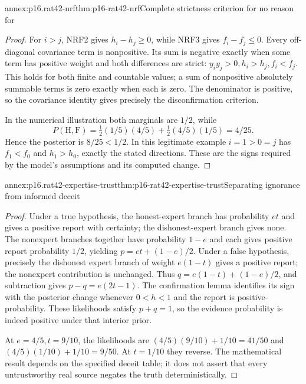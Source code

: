 \begin{annexitem}{annex:p16.rat42-nrf}{thm:p16-rat42-nrf}{Complete strictness criterion for no reason for}
\begin{proof}
For \(i>j\), NRF2 gives \(h_i-h_j\geq0\), while NRF3
gives \(f_i-f_j\leq0\). Every off-diagonal covariance term
is nonpositive. Its sum is negative exactly when some
term has positive weight and both differences are strict:
\(y_i y_j>0,h_i>h_j,f_i<f_j\). This holds for both finite
and countable values; a sum of nonpositive absolutely
summable terms is zero exactly when each is zero.
The denominator is positive, so the covariance identity
gives precisely the disconfirmation criterion.

In the numerical illustration both marginals are \(1/2\),
while
\[
 P(\mathrm H,\mathrm F)
       =\tfrac12(1/5)(4/5)+\tfrac12(4/5)(1/5)=4/25.
\]
Hence the posterior is \(8/25<1/2\). In this legitimate
example \(i=1>0=j\) has \(f_1<f_0\) and \(h_1>h_0\),
exactly the stated directions. These are the signs required
by the model's assumptions and its computed change.
\end{proof}
\end{annexitem}

\begin{annexitem}{annex:p16.rat42-expertise-trust}{thm:p16-rat42-expertise-trust}{Separating ignorance from informed deceit}
\begin{proof}
Under a true hypothesis, the honest-expert branch has probability
\(et\) and gives a positive report with certainty; the
dishonest-expert branch gives none. The nonexpert branches
together have probability \(1-e\) and each gives positive
report probability \(1/2\), yielding \(p=et+(1-e)/2\).
Under a false hypothesis, precisely the dishonest expert
branch of weight \(e(1-t)\) gives a positive report;
the nonexpert contribution is unchanged. Thus
\(q=e(1-t)+(1-e)/2\), and subtraction gives
\(p-q=e(2t-1)\). The confirmation lemma identifies its
sign with the posterior change whenever \(0<h<1\)
and the report is positive-probability. These likelihoods
satisfy \(p+q=1\), so the evidence probability is indeed
positive under that interior prior.

At \(e=4/5,t=9/10\), the likelihoods are
\((4/5)(9/10)+1/10=41/50\) and
\((4/5)(1/10)+1/10=9/50\). At \(t=1/10\)
they reverse. The mathematical result depends on the
specified deceit table; it does not assert that every
untrustworthy real source negates the truth deterministically.
\end{proof}
\end{annexitem}
